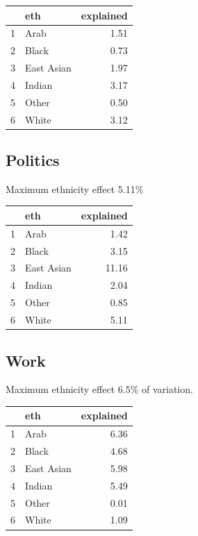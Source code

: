 \documentclass{amsart}
\begin{document}
\begin{table}[ht]
\centering
\begin{tabular}{rlr}
  \hline
 & eth & explained \\ 
  \hline
1 & Arab & 1.51 \\ 
  2 & Black & 0.73 \\ 
  3 & East Asian & 1.97 \\ 
  4 & Indian & 3.17 \\ 
  5 & Other & 0.50 \\ 
  6 & White & 3.12 \\ 
   \hline
\end{tabular}
\end{table}


\subsection{Politics}

Maximum ethnicity effect 5.11\%

\begin{table}[ht]
\centering
\begin{tabular}{rlr}
  \hline
 & eth & explained \\ 
  \hline
1 & Arab & 1.42 \\ 
  2 & Black & 3.15 \\ 
  3 & East Asian & 11.16 \\ 
  4 & Indian & 2.04 \\ 
  5 & Other & 0.85 \\ 
  6 & White & 5.11 \\ 
   \hline
\end{tabular}
\end{table}

\subsection{Work}

Maximum ethnicity effect 6.5\% of variation.

\begin{table}[ht]
\centering
\begin{tabular}{rlr}
  \hline
 & eth & explained \\ 
  \hline
1 & Arab & 6.36 \\ 
  2 & Black & 4.68 \\ 
  3 & East Asian & 5.98 \\ 
  4 & Indian & 5.49 \\ 
  5 & Other & 0.01 \\ 
  6 & White & 1.09 \\ 
   \hline
\end{tabular}
\end{table}
\end{document}

